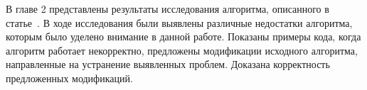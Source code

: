 \FloatBarrier

\chapterconclusion

В главе 2 представлены результаты исследования алгоритма,
описанного в статье~\cite{li2010practical}. В ходе исследования были
выявлены различные недостатки алгоритма, которым было уделено внимание
в данной работе. Показаны примеры кода, когда алгоритм работает
некорректно, предложены модификации исходного алгоритма, направленные
на устранение выявленных проблем. Доказана корректность предложенных
модификаций.
